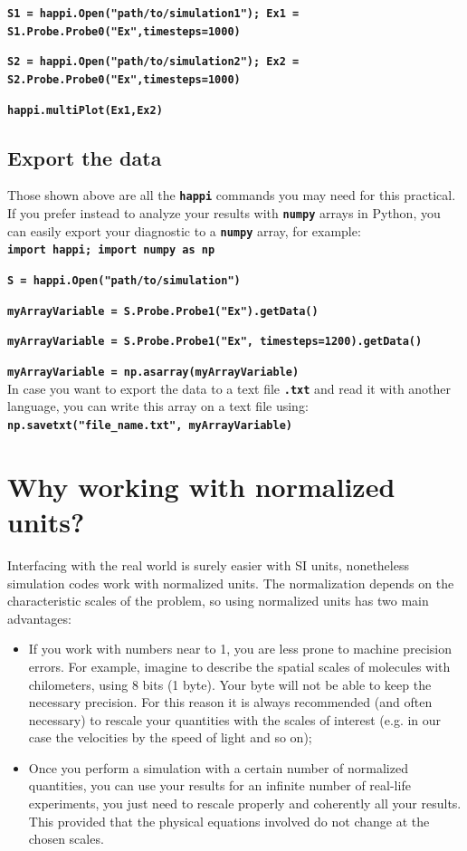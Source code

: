 \documentclass[a4paper,12pt]{extarticle}
\newcommand{\commandline}[1]{\texttt{\textbf{#1}}}
\begin{document}
\begin{appendices}
\commandline{S1 = happi.Open("path/to/simulation1"); Ex1 = S1.Probe.Probe0("Ex",timesteps=1000)}

\commandline{S2 = happi.Open("path/to/simulation2"); Ex2 = S2.Probe.Probe0("Ex",timesteps=1000)}

\commandline{happi.multiPlot(Ex1,Ex2)}

\subsection*{Export the data}
Those shown above are all the \commandline{happi} commands you may need for this practical. If you prefer instead to analyze your results with \commandline{numpy} arrays in Python, you can easily export your diagnostic to a \commandline{numpy} array, for example:\\

\commandline{import happi; import numpy as np}

\commandline{S =  happi.Open("path/to/simulation")}

\commandline{myArrayVariable = S.Probe.Probe1("Ex").getData()} 

\commandline{myArrayVariable = S.Probe.Probe1("Ex", timesteps=1200).getData()}

\commandline{myArrayVariable = np.asarray(myArrayVariable) }\\

In case you want to export the data to a text file \commandline{.txt} and read it with another language, you can write this array on a text file using:\\

\commandline{np.savetxt("file\_name.txt", myArrayVariable)}

\section{Why working with normalized units?}\label{normalized units}

Interfacing with the real world is surely easier with SI units, nonetheless simulation codes  work with normalized units. The normalization depends on the characteristic scales of the problem, so using normalized units has two main advantages:
\begin{itemize}
\item If you work with numbers near to 1, you are less prone to machine precision errors. For example, imagine to describe the spatial scales of molecules with chilometers, using 8 bits (1 byte). Your byte will not be able to keep  the necessary precision. For this reason it is always recommended (and often necessary) to rescale your quantities with the scales of interest (e.g. in our case the velocities by the speed of light and so on);
\item Once you perform a simulation with a certain number of normalized quantities, you can use your results for an infinite number of real-life experiments, you just need to rescale properly and coherently all your results. This provided that the physical equations involved do not change at the chosen scales.
\end{itemize}





\end{appendices}
\end{document}
